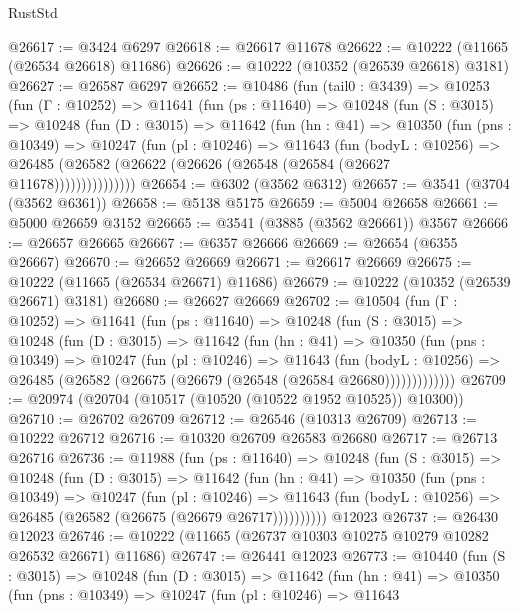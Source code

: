 \begin{lexlean}{RustStd}
\begin{coremodule}
@26617 := @3424 @6297
@26618 := @26617 @11678
@26622 := @10222 (@11665 (@26534 @26618) @11686)
@26626 := @10222 (@10352 (@26539 @26618) @3181)
@26627 := @26587 @6297
@26652 := @10486
    (fun (tail0 : @3439) =>
    @10253
      (fun (Γ : @10252) =>
      @11641
        (fun (ps : @11640) =>
        @10248
          (fun (S : @3015) =>
          @10248
            (fun (D : @3015) =>
            @11642
              (fun (hn : @41) =>
              @10350
                (fun (pns : @10349) =>
                @10247
                  (fun (pl : @10246) =>
                  @11643
                    (fun (bodyL : @10256) =>
                    @26485 (@26582 (@26622 (@26626 (@26548 (@26584 (@26627 @11678)))))))))))))))
@26654 := @6302 (@3562 @6312)
@26657 := @3541 (@3704 (@3562 @6361))
@26658 := @5138 @5175
@26659 := @5004 @26658
@26661 := @5000 @26659 @3152
@26665 := @3541 (@3885 (@3562 @26661)) @3567
@26666 := @26657 @26665
@26667 := @6357 @26666
@26669 := @26654 (@6355 @26667)
@26670 := @26652 @26669
@26671 := @26617 @26669
@26675 := @10222 (@11665 (@26534 @26671) @11686)
@26679 := @10222 (@10352 (@26539 @26671) @3181)
@26680 := @26627 @26669
@26702 := @10504
    (fun (Γ : @10252) =>
    @11641
      (fun (ps : @11640) =>
      @10248
        (fun (S : @3015) =>
        @10248
          (fun (D : @3015) =>
          @11642
            (fun (hn : @41) =>
            @10350
              (fun (pns : @10349) =>
              @10247
                (fun (pl : @10246) =>
                @11643
                  (fun (bodyL : @10256) =>
                  @26485 (@26582 (@26675 (@26679 (@26548 (@26584 @26680)))))))))))))
@26709 := @20974 (@20704 (@10517 (@10520 (@10522 @1952 @10525)) @10300))
@26710 := @26702 @26709
@26712 := @26546 (@10313 @26709)
@26713 := @10222 @26712
@26716 := @10320 @26709 @26583 @26680
@26717 := @26713 @26716
@26736 := @11988
    (fun (ps : @11640) =>
    @10248
      (fun (S : @3015) =>
      @10248
        (fun (D : @3015) =>
        @11642
          (fun (hn : @41) =>
          @10350
            (fun (pns : @10349) =>
            @10247
              (fun (pl : @10246) =>
              @11643 (fun (bodyL : @10256) => @26485 (@26582 (@26675 (@26679 @26717))))))))))
    @12023
@26737 := @26430 @12023
@26746 := @10222 (@11665 (@26737 @10303 @10275 @10279 @10282 @26532 @26671) @11686)
@26747 := @26441 @12023
@26773 := @10440
    (fun (S : @3015) =>
    @10248
      (fun (D : @3015) =>
      @11642
        (fun (hn : @41) =>
        @10350
          (fun (pns : @10349) =>
          @10247
            (fun (pl : @10246) =>
            @11643

\end{coremodule}
\end{lexlean}
